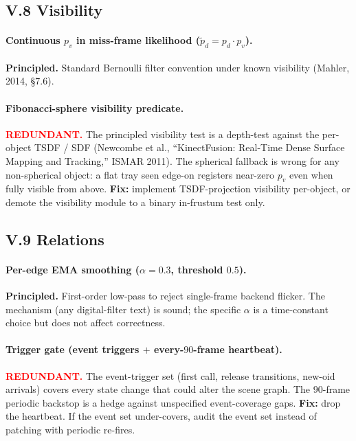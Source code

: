 \documentclass[11pt]{article}
\newcommand{\REDUNDANT}{\textcolor{red}{\textbf{REDUNDANT.}}}
\newcommand{\PRINCIPLED}{\textbf{Principled.}}
\begin{document}
\subsection*{V.8 Visibility}

\paragraph{Continuous $p_v$ in miss-frame likelihood
($\tilde p_d=p_d\cdot p_v$).}
\PRINCIPLED{} Standard Bernoulli filter convention under known
visibility (Mahler, 2014, \S 7.6).

\paragraph{Fibonacci-sphere visibility predicate.}
\REDUNDANT{} The principled visibility test is a depth-test against
the per-object TSDF / SDF (Newcombe et al., ``KinectFusion: Real-Time
Dense Surface Mapping and Tracking,'' ISMAR 2011). The spherical
fallback is wrong for any non-spherical object: a flat tray seen
edge-on registers near-zero $p_v$ even when fully visible from above.
\textbf{Fix:} implement TSDF-projection visibility per-object, or
demote the visibility module to a binary in-frustum test only.

\subsection*{V.9 Relations}

\paragraph{Per-edge EMA smoothing ($\alpha=0.3$, threshold $0.5$).}
\PRINCIPLED{} First-order low-pass to reject single-frame backend
flicker. The mechanism (any digital-filter text) is sound; the
specific $\alpha$ is a time-constant choice but does not affect
correctness.

\paragraph{Trigger gate (event triggers $+$ every-$90$-frame heartbeat).}
\REDUNDANT{} The event-trigger set (first call, release transitions,
new-oid arrivals) covers every state change that could alter the scene
graph. The $90$-frame periodic backstop is a hedge against unspecified
event-coverage gaps.
\textbf{Fix:} drop the heartbeat. If the event set under-covers, audit
the event set instead of patching with periodic re-fires.
\end{document}
